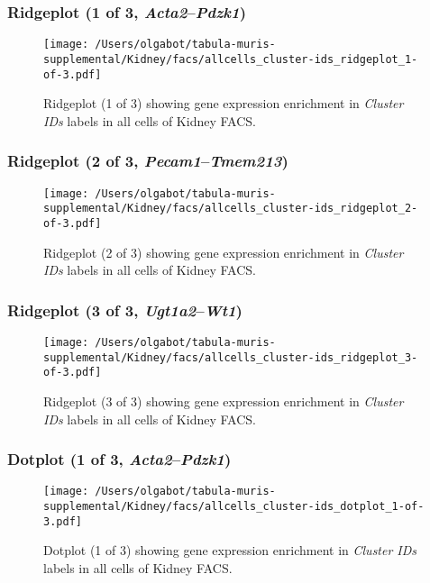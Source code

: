 \clearpage

\subsubsection{Ridgeplot (1 of 3, \emph{Acta2}--\emph{Pdzk1})}
\begin{figure}[h]
\centering
\texttt{[image: /Users/olgabot/tabula-muris-supplemental/Kidney/facs/allcells\_cluster-ids\_ridgeplot\_1-of-3.pdf]}

\caption{ Ridgeplot (1 of 3)  showing gene expression enrichment in \emph{Cluster IDs} labels in all cells of Kidney FACS. }
\end{figure}


\clearpage

\subsubsection{Ridgeplot (2 of 3, \emph{Pecam1}--\emph{Tmem213})}
\begin{figure}[h]
\centering
\texttt{[image: /Users/olgabot/tabula-muris-supplemental/Kidney/facs/allcells\_cluster-ids\_ridgeplot\_2-of-3.pdf]}

\caption{ Ridgeplot (2 of 3)  showing gene expression enrichment in \emph{Cluster IDs} labels in all cells of Kidney FACS. }
\end{figure}


\clearpage

\subsubsection{Ridgeplot (3 of 3, \emph{Ugt1a2}--\emph{Wt1})}
\begin{figure}[h]
\centering
\texttt{[image: /Users/olgabot/tabula-muris-supplemental/Kidney/facs/allcells\_cluster-ids\_ridgeplot\_3-of-3.pdf]}

\caption{ Ridgeplot (3 of 3)  showing gene expression enrichment in \emph{Cluster IDs} labels in all cells of Kidney FACS. }
\end{figure}


\clearpage

\subsubsection{Dotplot (1 of 3, \emph{Acta2}--\emph{Pdzk1})}
\begin{figure}[h]
\centering
\texttt{[image: /Users/olgabot/tabula-muris-supplemental/Kidney/facs/allcells\_cluster-ids\_dotplot\_1-of-3.pdf]}

\caption{ Dotplot (1 of 3)  showing gene expression enrichment in \emph{Cluster IDs} labels in all cells of Kidney FACS. }
\end{figure}


